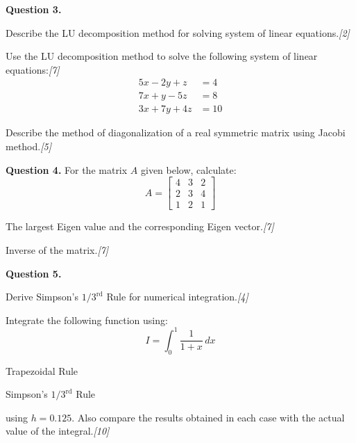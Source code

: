 \documentclass[11pt,a4paper]{article}
\newcommand{\pts}[1]{\hfill   \textit{[#1]}}
\begin{document}
\medskip


\noindent   \textbf{Question 3.}

\begin{parts}
  \item Describe the LU decomposition method for solving system of linear equations.\pts{2}
  \item Use the LU decomposition method to solve the following system of linear equations:\pts{7}
  \[
  
\begin{aligned}
    5x - 2y + z &= 4 \\
    7x + y - 5z &= 8 \\
    3x + 7y + 4z &= 10
  \end{aligned}
  \]
  \item Describe the method of diagonalization of a real symmetric matrix using Jacobi method.\pts{5}
\end{parts}

\medskip


\noindent   \textbf{Question 4.} For the matrix $A$ given below, calculate:
\[ A = 
\begin{bmatrix} 4 & 3 & 2 \\ 2 & 3 & 4 \\ 1 & 2 & 1 \end{bmatrix} \]

\begin{parts}
  \item The largest Eigen value and the corresponding Eigen vector.\pts{7}
  \item Inverse of the matrix.\pts{7}
\end{parts}

\medskip


\noindent   \textbf{Question 5.}

\begin{parts}
  \item Derive Simpson's $1/3^{ \text{rd}}$ Rule for numerical integration.\pts{4}
  \item Integrate the following function using:
  \[ I = \int_{0}^{1} \frac{1}{1+x} \, dx \]
  
\begin{parts}
    \item Trapezoidal Rule
    \item Simpson's $1/3^{ \text{rd}}$ Rule
  \end{parts}
  using $h = 0.125$. Also compare the results obtained in each case with the actual value of the integral.\pts{10}
\end{parts}
\end{document}
